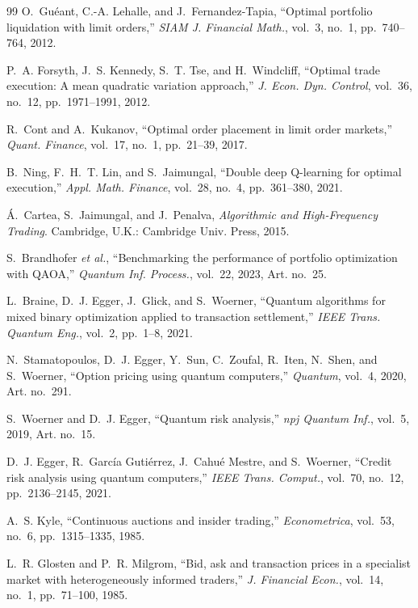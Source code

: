 \documentclass[journal]{IEEEtran}
\begin{document}
\begin{thebibliography}{99}
O.~Gu{\'e}ant, C.-A. Lehalle, and J.~Fernandez-Tapia, ``Optimal portfolio liquidation with
limit orders,'' \emph{SIAM J. Financial Math.}, vol.~3, no.~1, pp.~740--764, 2012.

P.~A. Forsyth, J.~S. Kennedy, S.~T. Tse, and H.~Windcliff, ``Optimal trade execution: A mean
quadratic variation approach,'' \emph{J. Econ. Dyn. Control}, vol.~36, no.~12,
pp.~1971--1991, 2012.

R.~Cont and A.~Kukanov, ``Optimal order placement in limit order markets,'' \emph{Quant.
Finance}, vol.~17, no.~1, pp.~21--39, 2017.

B.~Ning, F.~H.~T. Lin, and S.~Jaimungal, ``Double deep Q-learning for optimal execution,''
\emph{Appl. Math. Finance}, vol.~28, no.~4, pp.~361--380, 2021.

{\'A}.~Cartea, S.~Jaimungal, and J.~Penalva, \emph{Algorithmic and High-Frequency
Trading}. Cambridge, U.K.: Cambridge Univ. Press, 2015.

S.~Brandhofer \emph{et al.}, ``Benchmarking the performance of portfolio optimization with
QAOA,'' \emph{Quantum Inf. Process.}, vol.~22, 2023, Art. no.~25.%

L.~Braine, D.~J. Egger, J.~Glick, and S.~Woerner, ``Quantum algorithms for mixed binary
optimization applied to transaction settlement,'' \emph{IEEE Trans. Quantum Eng.}, vol.~2,
pp.~1--8, 2021.%

N.~Stamatopoulos, D.~J. Egger, Y.~Sun, C.~Zoufal, R.~Iten, N.~Shen, and S.~Woerner,
``Option pricing using quantum computers,'' \emph{Quantum}, vol.~4, 2020, Art. no.~291.

S.~Woerner and D.~J. Egger, ``Quantum risk analysis,'' \emph{npj Quantum Inf.}, vol.~5,
2019, Art. no.~15.

D.~J. Egger, R.~Garc{\'i}a Guti{\'e}rrez, J.~Cahu{\'e} Mestre, and S.~Woerner, ``Credit
risk analysis using quantum computers,'' \emph{IEEE Trans. Comput.}, vol.~70, no.~12,
pp.~2136--2145, 2021.

A.~S. Kyle, ``Continuous auctions and insider trading,'' \emph{Econometrica}, vol.~53,
no.~6, pp.~1315--1335, 1985.

L.~R. Glosten and P.~R. Milgrom, ``Bid, ask and transaction prices in a specialist market
with heterogeneously informed traders,'' \emph{J. Financial Econ.}, vol.~14, no.~1,
pp.~71--100, 1985.


\end{thebibliography}
\end{document}
